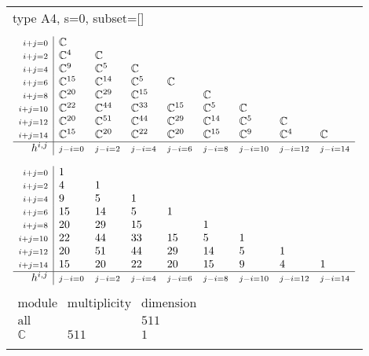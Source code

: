 \documentclass[crop,border=2mm]{standalone}
\begin{document}
\begin{tabular}{l}
{\huge type A4, s=0, subset=[]}\\ \\


$\displaystyle
\begin{array}{r|l l l l l l l l}
	{\scriptstyle i+j=0}&\mathbb{C}&&&&&&&\\
	{\scriptstyle i+j=2}&\mathbb{C}^{4}&\mathbb{C}&&&&&&\\
	{\scriptstyle i+j=4}&\mathbb{C}^{9}&\mathbb{C}^{5}&\mathbb{C}&&&&&\\
	{\scriptstyle i+j=6}&\mathbb{C}^{15}&\mathbb{C}^{14}&\mathbb{C}^{5}&\mathbb{C}&&&&\\
	{\scriptstyle i+j=8}&\mathbb{C}^{20}&\mathbb{C}^{29}&\mathbb{C}^{15}&&\mathbb{C}&&&\\
	{\scriptstyle i+j=10}&\mathbb{C}^{22}&\mathbb{C}^{44}&\mathbb{C}^{33}&\mathbb{C}^{15}&\mathbb{C}^{5}&\mathbb{C}&&\\
	{\scriptstyle i+j=12}&\mathbb{C}^{20}&\mathbb{C}^{51}&\mathbb{C}^{44}&\mathbb{C}^{29}&\mathbb{C}^{14}&\mathbb{C}^{5}&\mathbb{C}&\\
	{\scriptstyle i+j=14}&\mathbb{C}^{15}&\mathbb{C}^{20}&\mathbb{C}^{22}&\mathbb{C}^{20}&\mathbb{C}^{15}&\mathbb{C}^{9}&\mathbb{C}^{4}&\mathbb{C}\\
	\hline h^{i,j}&{\scriptstyle j-i=0}&{\scriptstyle j-i=2}&{\scriptstyle j-i=4}&{\scriptstyle j-i=6}&{\scriptstyle j-i=8}&{\scriptstyle j-i=10}&{\scriptstyle j-i=12}&{\scriptstyle j-i=14}
\end{array}
$ \\ \\


$\displaystyle
\begin{array}{r|l l l l l l l l}
	{\scriptstyle i+j=0}&1&&&&&&&\\
	{\scriptstyle i+j=2}&4&1&&&&&&\\
	{\scriptstyle i+j=4}&9&5&1&&&&&\\
	{\scriptstyle i+j=6}&15&14&5&1&&&&\\
	{\scriptstyle i+j=8}&20&29&15&&1&&&\\
	{\scriptstyle i+j=10}&22&44&33&15&5&1&&\\
	{\scriptstyle i+j=12}&20&51&44&29&14&5&1&\\
	{\scriptstyle i+j=14}&15&20&22&20&15&9&4&1\\
	\hline h^{i,j}&{\scriptstyle j-i=0}&{\scriptstyle j-i=2}&{\scriptstyle j-i=4}&{\scriptstyle j-i=6}&{\scriptstyle j-i=8}&{\scriptstyle j-i=10}&{\scriptstyle j-i=12}&{\scriptstyle j-i=14}
\end{array}
$ \\ \\


$\displaystyle
\begin{array}{rll}
	\text{module}&\text{multiplicity}&\text{dimension} \\ \hline \text{all}&&511 \\
	\mathbb{C}&511&1
\end{array}
$ \\ \\

\end{tabular}
\end{document}
